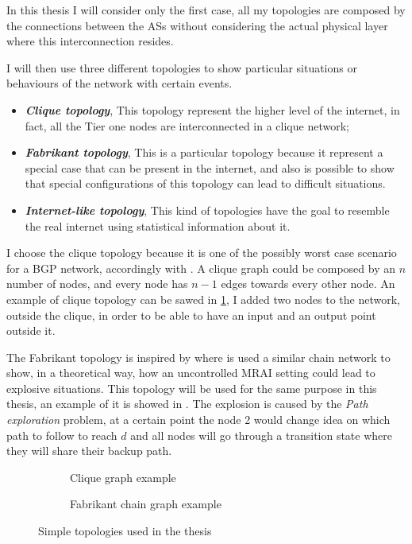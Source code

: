 In this thesis I will consider only the first case, all my topologies are composed by
the connections between the \acp{AS} without considering the actual physical layer
where this interconnection resides.

I will then use three different topologies to show particular situations or
behaviours of the network with certain events.
\begin{itemize}
	\item \textbf{\textit{Clique topology}}, This topology represent the higher
		level of the internet, in fact, all the Tier one nodes are interconnected
		in a clique network;
	\item \textbf{\textit{Fabrikant topology}}, This is a particular topology
		because it represent a special case that can be present in the internet,
		and also is possible to show that special configurations of this topology
		can lead to difficult situations.
	\item \textbf{\textit{Internet-like topology}}, This kind of topologies
		have the goal to resemble the real internet using statistical information
		about it.
\end{itemize}

I choose the clique topology because it is one of the possibly worst
case scenario for a \ac{BGP} network, accordingly with \cite{labovitz2000delayed}.
A clique graph could be composed by an $n$ number of nodes, and every node has
$n-1$ edges towards every other node.
An example of clique topology can be sawed in \cref{fig:clique_topology}, I added
two nodes to the network, outside the clique, in order to be able to have an
input and an output point outside it.

The Fabrikant topology is inspired by \cite{fabrikant2011there} where is used
a similar chain network to show, in a theoretical way, how an uncontrolled
\ac{MRAI} setting could lead to explosive situations.
This topology will be used for the same purpose in this thesis, an example
of it is showed in .
The explosion is caused by the \textit{Path exploration} problem, at a certain
point the node \num{2} would change idea on which path to follow to reach $d$
and all nodes will go through a transition state where they will
share their backup path.

\begin{figure}[ht]
     \centering
     \begin{subfigure}[b]{0.45\textwidth}
         \centering
		 
		 \caption{Clique graph example}
    	 \label{fig:clique_topology}
     \end{subfigure}
     \hfill
     \begin{subfigure}[b]{0.45\textwidth}
         \centering
         
		 \caption{Fabrikant chain graph example}
		 \label{fig:fabrikant_topology}
     \end{subfigure}
		\caption{Simple topologies used in the thesis}
        \label{fig:clique_and_fabrikant}
\end{figure}

